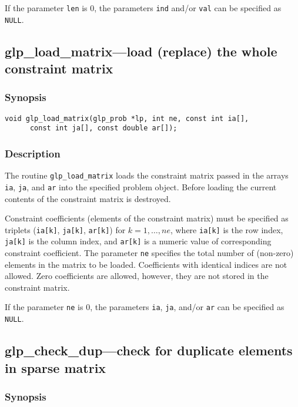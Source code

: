 If the parameter \verb|len| is 0, the parameters \verb|ind| and/or
\verb|val| can be specified as \verb|NULL|.

\subsection{glp\_load\_matrix---load (replace) the whole constraint
matrix}

\subsubsection*{Synopsis}

\begin{verbatim}
void glp_load_matrix(glp_prob *lp, int ne, const int ia[],
      const int ja[], const double ar[]);
\end{verbatim}

\subsubsection*{Description}

The routine \verb|glp_load_matrix| loads the constraint matrix passed
in  the arrays \verb|ia|, \verb|ja|, and \verb|ar| into the specified
problem object. Before loading the current contents of the constraint
matrix is destroyed.

Constraint coefficients (elements of the constraint matrix) must be
specified as triplets (\verb|ia[k]|, \verb|ja[k]|, \verb|ar[k]|) for
$k=1,\dots,ne$, where \verb|ia[k]| is the row index, \verb|ja[k]| is
the column index, and \verb|ar[k]| is a numeric value of corresponding
constraint coefficient. The parameter \verb|ne| specifies the total
number of (non-zero) elements in the matrix to be loaded. Coefficients
with identical indices are not allowed. Zero coefficients are allowed,
however, they are not stored in the constraint matrix.

If the parameter \verb|ne| is 0, the parameters \verb|ia|, \verb|ja|,
and/or \verb|ar| can be specified as \verb|NULL|.

\subsection{glp\_check\_dup---check for duplicate elements in sparse
matrix}

\subsubsection*{Synopsis}

